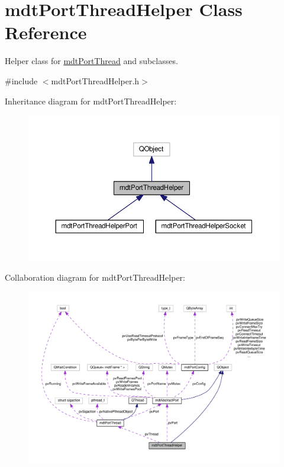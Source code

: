 \hypertarget{classmdt_port_thread_helper}{\section{mdt\-Port\-Thread\-Helper Class Reference}
\label{classmdt_port_thread_helper}
}


Helper class for \hyperlink{classmdt_port_thread}{mdt\-Port\-Thread} and subclasses.  




{\ttfamily \#include $<$mdt\-Port\-Thread\-Helper.\-h$>$}



Inheritance diagram for mdt\-Port\-Thread\-Helper\-:
\nopagebreak
\begin{figure}[H]
\begin{center}
\leavevmode
\includegraphics[width=350pt]{classmdt_port_thread_helper__inherit__graph}
\end{center}
\end{figure}


Collaboration diagram for mdt\-Port\-Thread\-Helper\-:
\nopagebreak
\begin{figure}[H]
\begin{center}
\leavevmode
\includegraphics[width=350pt]{classmdt_port_thread_helper__coll__graph}
\end{center}
\end{figure}
